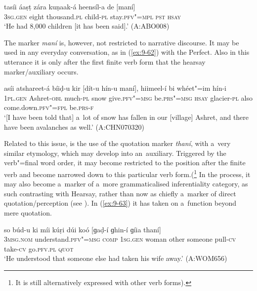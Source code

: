 \begin{exe}
\ex
\label{ex:9-61}
\gll tasíi áaṣṭ zára kuṇaak-á heensíl-a de [maní] \\
3\textsc{sg.gen} eight thousand.\textsc{pl} child-\textsc{pl} stay.\textsc{pfv"=mpl} \textsc{pst} \textsc{hsay} \\
\glt `He had 8,000 children [it has been said].' (A:ABO008)
\end{exe}

The marker \textit{maní} is, however, not restricted to narrative discourse. It may be used in any everyday conversation, as in (\ref{ex:9-62}) with the Perfect. Also in this utterance it is only after the first finite verb form that the hearsay marker/auxiliary occurs.

\begin{exe}
\ex
\label{ex:9-62}
\gll asíi atshareet-á bíiḍ-u kir [dít-u hín-u maní], hiimeel-í bi whéet"=im hín-i \\
\textsc{1pl.gen} Ashret-\textsc{obl} much-\textsc{pl} snow give.\textsc{pfv"=msg} be.\textsc{prs"=msg} \textsc{hsay} glacier-\textsc{pl} also come.down.\textsc{pfv"=fpl} be.\textsc{prs-f} \\
\glt `[I have been told that] a~lot of snow has fallen in our [village] Ashret, and there have been avalanches as well.' (A:CHN070320)
\end{exe}

Related to this issue, is the use of the quotation marker \textit{thaní}, with a~very similar etymology, which may develop into an~auxiliary. Triggered by the verb"=final word order, it may become restricted to the position after the finite verb and become narrowed down to this particular verb form.(\footnote{It is still alternatively expressed with other verb forms).} In the process, it may also become a~marker of a~more grammaticalised inferentiality category, as such contrasting with Hearsay, rather than now as chiefly a~marker of direct quotation/perception (see ). In (\ref{ex:9-63}) it has taken on a~function beyond mere quotation.

\begin{exe}
\ex
\label{ex:9-63}
\gll so búd-u ki míi kúṛi dúi koó [ɡaḍ-í ɡhin-í ɡíia thaní]  \\
\textsc{3msg.nom} understand.\textsc{pfv"=msg} \textsc{comp} \textsc{1sg.gen} woman  other someone pull-\textsc{cv} take-\textsc{cv} go.\textsc{pfv.pl} \textsc{quot} \\
\glt `He understood that someone else had taken his wife away.' (A:WOM656)
\end{exe}

